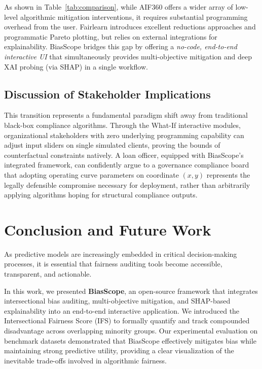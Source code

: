 \documentclass[conference]{IEEEtran}
\begin{document}
As shown in Table~\ref{tab:comparison}, while AIF360 offers a wider array of low-level algorithmic mitigation interventions, it requires substantial programming overhead from the user. Fairlearn introduces excellent reductions approaches and programmatic Pareto plotting, but relies on external integrations for explainability. BiasScope bridges this gap by offering a \textit{no-code, end-to-end interactive UI} that simultaneously provides multi-objective mitigation and deep XAI probing (via SHAP) in a single workflow.

\subsection{Discussion of Stakeholder Implications}
This transition represents a fundamental paradigm shift away from traditional black-box compliance algorithms. Through the What-If interactive modules, organizational stakeholders with zero underlying programming capability can adjust input sliders on single simulated clients, proving the bounds of counterfactual constraints natively. A loan officer, equipped with BiasScope's integrated framework, can confidently argue to a governance compliance board that adopting operating curve parameters on coordinate $(x,y)$ represents the legally defensible compromise necessary for deployment, rather than arbitrarily applying algorithms hoping for structural compliance outputs.

\section{Conclusion and Future Work} \label{sec:conclusion}

As predictive models are increasingly embedded in critical decision-making processes, it is essential that fairness auditing tools become accessible, transparent, and actionable. 

In this work, we presented \textbf{BiasScope}, an open-source framework that integrates intersectional bias auditing, multi-objective mitigation, and SHAP-based explainability into an end-to-end interactive application. We introduced the Intersectional Fairness Score (IFS) to formally quantify and track compounded disadvantage across overlapping minority groups. Our experimental evaluation on benchmark datasets demonstrated that BiasScope effectively mitigates bias while maintaining strong predictive utility, providing a clear visualization of the inevitable trade-offs involved in algorithmic fairness. 
\end{document}
